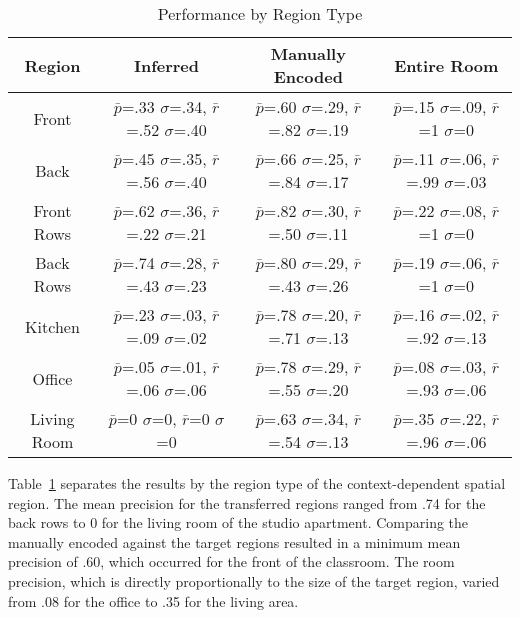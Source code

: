 \begin{table}
\small
\begin{tabular}{|c|c|c|c|}
\hline
Region & Inferred & Manually Encoded & Entire Room \\
\hline
Front & $\bar{p}$=.33 $\sigma$=.34, $\bar{r}$=.52 $\sigma$=.40 & $\bar{p}$=.60 $\sigma$=.29, $\bar{r}$=.82 $\sigma$=.19  & $\bar{p}$=.15 $\sigma$=.09, $\bar{r}$=1 $\sigma$=0  \\
\hline
Back & $\bar{p}$=.45 $\sigma$=.35, $\bar{r}$=.56 $\sigma$=.40 & $\bar{p}$=.66 $\sigma$=.25, $\bar{r}$=.84 $\sigma$=.17  & $\bar{p}$=.11 $\sigma$=.06, $\bar{r}$=.99 $\sigma$=.03  \\
\hline
Front Rows & $\bar{p}$=.62 $\sigma$=.36, $\bar{r}$=.22 $\sigma$=.21 & $\bar{p}$=.82 $\sigma$=.30, $\bar{r}$=.50 $\sigma$=.11  & $\bar{p}$=.22 $\sigma$=.08, $\bar{r}$=1 $\sigma$=0  \\
\hline
Back Rows & $\bar{p}$=.74 $\sigma$=.28, $\bar{r}$=.43 $\sigma$=.23 & $\bar{p}$=.80 $\sigma$=.29, $\bar{r}$=.43 $\sigma$=.26  & $\bar{p}$=.19 $\sigma$=.06, $\bar{r}$=1 $\sigma$=0  \\
\hline
Kitchen & $\bar{p}$=.23 $\sigma$=.03, $\bar{r}$=.09 $\sigma$=.02 & $\bar{p}$=.78 $\sigma$=.20, $\bar{r}$=.71 $\sigma$=.13  & $\bar{p}$=.16 $\sigma$=.02, $\bar{r}$=.92 $\sigma$=.13  \\
\hline
Office & $\bar{p}$=.05 $\sigma$=.01, $\bar{r}$=.06 $\sigma$=.06 & $\bar{p}$=.78 $\sigma$=.29, $\bar{r}$=.55 $\sigma$=.20  & $\bar{p}$=.08 $\sigma$=.03, $\bar{r}$=.93 $\sigma$=.06  \\
\hline
Living Room & $\bar{p}$=0 $\sigma$=0, $\bar{r}$=0 $\sigma$=0 & $\bar{p}$=.63 $\sigma$=.34, $\bar{r}$=.54 $\sigma$=.13  & $\bar{p}$=.35 $\sigma$=.22, $\bar{r}$=.96 $\sigma$=.06  \\
\hline
\end{tabular}
\caption{Performance by Region Type}
  \label{tab:region}	
\end{table}

Table~\ref{tab:region} separates the results by the region type of the context-dependent spatial region. The mean precision for the transferred regions ranged from .74 for the back rows to 0 for the living room of the studio apartment. Comparing the manually encoded against the target regions resulted in a minimum mean precision of .60, which occurred for the front of the classroom. The room precision, which is directly proportionally to the size of the target region, varied from .08 for the office to .35 for the living area. 


